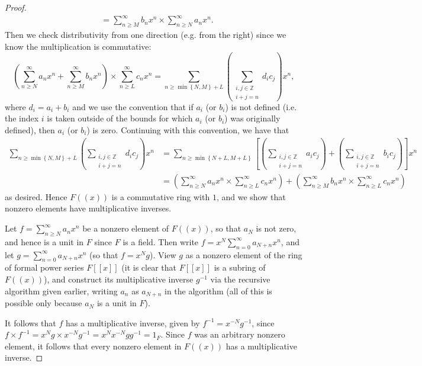 \documentclass[11pt]{article}
\newcommand{\br}[1]{\left(#1\right)}
\newcommand{\sbr}[1]{\left[#1\right]}
\newcommand{\cbr}[1]{\left\{#1\right\}}
\begin{document}
\begin{enumerate}
\begin{enumerate}
\begin{proof}
\begin{align*}
                &= \sum_{n\geq M}^\infty b_nx^n\times \sum_{n\geq N}^\infty a_nx^n.
            \end{align*}
            Then we check distributivity from one direction (e.g. from the right) since we know the multiplication is commutative: \[\br{\sum_{n\geq N}^\infty a_nx^n +\sum_{n\geq M}^\infty b_nx^n }\times \sum_{n\geq L}^\infty c_nx^n = \sum_{n\geq \min\cbr{N,M} + L}\br{\sum_{\substack{i,j\in\mathbb{Z}\\i+j = n}}d_ic_j}x^n,\] where $d_i = a_i+b_i$ and we use the convention that if $a_i$ (or $b_i$) is not defined (i.e. the index $i$ is taken outside of the bounds for which $a_i$ (or $b_i$) was originally defined), then $a_i$ (or $b_i$) is zero. Continuing with this convention, we have that \begin{align*}
                \sum_{n\geq \min\cbr{N,M} + L}\br{\sum_{\substack{i,j\in\mathbb{Z}\\i+j = n}}d_ic_j}x^n &= \sum_{n\geq \min\cbr{N+L,M+L}} \sbr{\br{\sum_{\substack{i,j\in\mathbb{Z}\\i+j = n}}a_ic_j} + \br{\sum_{\substack{i,j\in\mathbb{Z}\\i+j = n}}b_ic_j}}x^n\\
                &= \br{\sum_{n\geq N}^\infty a_nx^n \times \sum_{n\geq L}^\infty c_nx^n} + \br{\sum_{n\geq M}^\infty b_nx^n \times \sum_{n\geq L}^\infty c_nx^n} 
            \end{align*} as desired. Hence $F((x))$ is a commutative ring with $1$, and we show that nonzero elements have multiplicative inverses.

            Let $f = \sum_{n\geq N}^\infty a_nx^n$ be a nonzero element of $F((x))$, so that $a_N$ is not zero, and hence is a unit in $F$ since $F$ is a field. Then write $f = x^N\sum_{n=0}^{\infty}a_{N+n}x^n$, and let $g = \sum_{n=0}^{\infty}a_{N+n}x^n$ (so that $f = x^Ng$). View $g$ as a nonzero element of the ring of formal power series $F[[x]]$ (it is clear that $F[[x]]$ is a subring of $F((x))$), and construct its multiplicative inverse $g^{-1}$ via the recursive algorithm given earlier, writing $a_n$ as $a_{N+n}$ in the algorithm (all of this is possible only because $a_N$ is a unit in $F$).

            It follows that $f$ has a multiplicative inverse, given by $f^{-1} = x^{-N}g^{-1}$, since $f\times f^{-1} = x^Ng\times x^{-N}g^{-1} = x^Nx^{-N} g g^{-1} = 1_F$. Since $f$ was an arbitrary nonzero element, it follows that every nonzero element in $F((x))$ has a multiplicative inverse. 


\end{proof}
\end{enumerate}
\end{enumerate}
\end{document}
